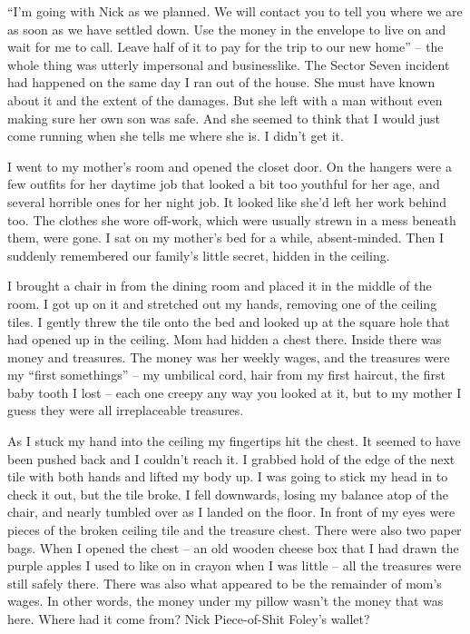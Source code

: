\documentclass[oneside]{book}
\begin{document}
“I’m going with Nick as we planned. We will contact you to tell you where we are as soon as we have settled down. Use the money in the envelope to live on and wait for me to call. Leave half of it to pay for the trip to our new home” – the whole thing was utterly impersonal and businesslike. The Sector Seven incident had happened on the same day I ran out of the house. She must have known about it and the extent of the damages. But she left with a man without even making sure her own son was safe. And she seemed to think that I would just come running when she tells me where she is. I didn’t get it.

I went to my mother’s room and opened the closet door. On the hangers were a few outfits for her daytime job that looked a bit too youthful for her age, and several horrible ones for her night job. It looked like she’d left her work behind too. The clothes she wore off-work, which were usually strewn in a mess beneath them, were gone. I sat on my mother’s bed for a while, absent-minded. Then I suddenly remembered our family’s little secret, hidden in the ceiling.

I brought a chair in from the dining room and placed it in the middle of the room. I got up on it and stretched out my hands, removing one of the ceiling tiles. I gently threw the tile onto the bed and looked up at the square hole that had opened up in the ceiling. Mom had hidden a chest there. Inside there was money and treasures. The money was her weekly wages, and the treasures were my “first somethings” – my umbilical cord, hair from my first haircut, the first baby tooth I lost – each one creepy any way you looked at it, but to my mother I guess they were all irreplaceable treasures.

As I stuck my hand into the ceiling my fingertips hit the chest. It seemed to have been pushed back and I couldn’t reach it. I grabbed hold of the edge of the next tile with both hands and lifted my body up. I was going to stick my head in to check it out, but the tile broke. I fell downwards, losing my balance atop of the chair, and nearly tumbled over as I landed on the floor. In front of my eyes were pieces of the broken ceiling tile and the treasure chest. There were also two paper bags. When I opened the chest – an old wooden cheese box that I had drawn the purple apples I used to like on in crayon when I was little – all the treasures were still safely there. There was also what appeared to be the remainder of mom’s wages. In other words, the money under my pillow wasn’t the money that was here. Where had it come from? Nick Piece-of-Shit Foley’s wallet?
\end{document}
